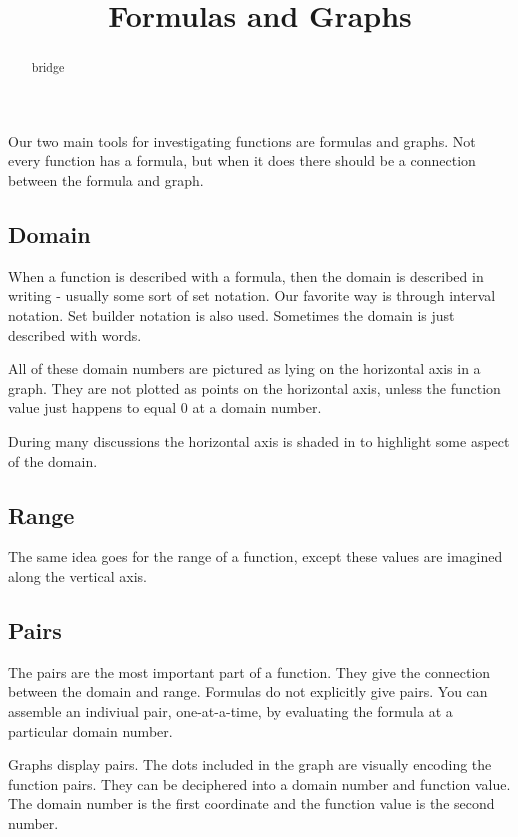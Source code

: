 \documentclass{ximera}
\title{Formulas and Graphs}
\begin{document}
\begin{abstract}
bridge
\end{abstract}
\maketitle



Our two main tools for investigating functions are formulas and graphs. Not every function has a formula, but when it does there should be a connection between the formula and graph.

\subsection{Domain}
When a function is described with a formula, then the domain is described in writing - usually some sort of set notation.  Our favorite way is through interval notation.  Set builder notation is also used.  Sometimes the domain is just described with words.

All of these domain numbers are pictured as lying on the horizontal axis in a graph.  They are not plotted as points on the horizontal axis, unless the function value just happens to equal $0$ at a domain number.

During many discussions the horizontal axis is shaded in to highlight some aspect of the domain.







\subsection{Range}
The same idea goes for the range of a function, except these values are imagined along the vertical axis.








\subsection{Pairs}
The pairs are the most important part of a function.  They give the connection between the domain and range.  Formulas do not explicitly give pairs. You can assemble an indiviual pair, one-at-a-time, by evaluating the formula at a particular domain number.

Graphs display pairs.  The dots included in the graph are visually encoding the function pairs.  They can be deciphered into a domain number and function value. The domain number is the first coordinate and the function value is the second number.
\end{document}
